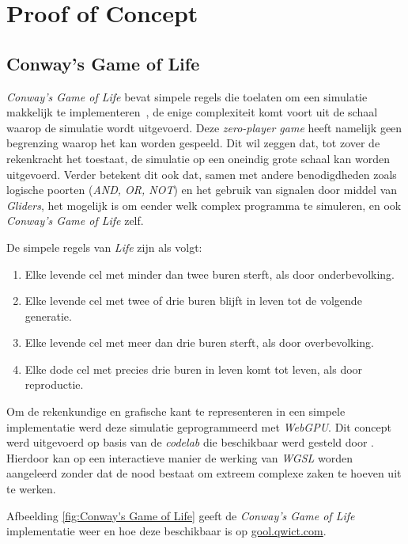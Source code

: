 \chapter{Proof of Concept}
\label{ch:poc}

\section{Conway's Game of Life}
\label{sec:gool}

\textit{Conway's Game of Life} bevat simpele regels die toelaten om een simulatie makkelijk te implementeren~\autocite{Gardner1970}, de enige complexiteit komt voort uit de schaal waarop de simulatie wordt uitgevoerd. Deze \textit{zero-player game} heeft namelijk geen begrenzing waarop het kan worden gespeeld. Dit wil zeggen dat, tot zover de rekenkracht het toestaat, de simulatie op een oneindig grote schaal kan worden uitgevoerd. Verder betekent dit ook dat, samen met andere benodigdheden zoals logische poorten (\textit{AND, OR, NOT}) en het gebruik van signalen door middel van \textit{Gliders}, het mogelijk is om eender welk complex programma te simuleren, en ook \textit{Conway's Game of Life} zelf.

\bigbreak{}

De simpele regels van \textit{Life} zijn als volgt:
\begin{enumerate}
    \item Elke levende cel met minder dan twee buren sterft, als door onderbevolking.
    \item Elke levende cel met twee of drie buren blijft in leven tot de volgende generatie.
    \item Elke levende cel met meer dan drie buren sterft, als door overbevolking.
    \item Elke dode cel met precies drie buren in leven komt tot leven, als door reproductie.
\end{enumerate}

\break{}

Om de rekenkundige en grafische kant te representeren in een simpele implementatie werd deze simulatie geprogrammeerd met \textit{WebGPU}. Dit concept werd uitgevoerd op basis van de \textit{codelab} die beschikbaar werd gesteld door \textcite{google2023}. Hierdoor kan op een interactieve manier de werking van \textit{WGSL} worden aangeleerd zonder dat de nood bestaat om extreem complexe zaken te hoeven uit te werken.

\bigbreak{}

Afbeelding \ref{fig:Conway's Game of Life} geeft de \textit{Conway's Game of Life} implementatie weer en hoe deze beschikbaar is op \href{https://gool.qwict.com}{gool.qwict.com}.

